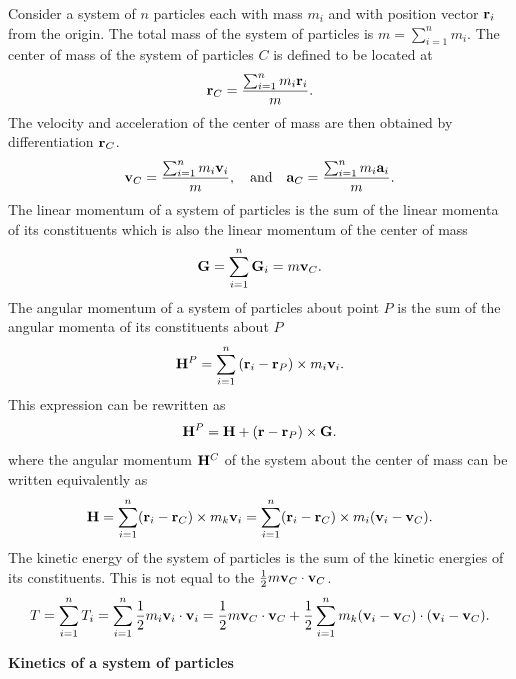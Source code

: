 \documentclass[
  letterpaper,
  DIV=11,
  numbers=noendperiod]{scrreprt}
\newcommand{\lp}{\left(}
\newcommand{\rp}{\right)}
\begin{document}
Consider a system of \(n\) particles each with mass \(m_i\) and with
position vector \({\bf r}_i\) from the origin. The total mass of the
system of particles is \(m = \sum_{i=1}^n m_i\). The center of mass of
the system of particles \(C\) is defined to be located at \begin{align}
    {\bf r}_C = \frac{\sum_{i=1}^n m_i{\bf r}_i}{m}.
\end{align} The velocity and acceleration of the center of mass are then
obtained by differentiation \({\bf r}_C\). \begin{align}
    {\bf v}_C = \frac{\sum_{i=1}^n m_i{\bf v}_i}{m},\quad\text{and}\quad{\bf a}_C = \frac{\sum_{i=1}^n m_i{\bf a}_i}{m}.
\end{align} The linear momentum of a system of particles is the sum of
the linear momenta of its constituents which is also the linear momentum
of the center of mass \begin{align}
    {\bf G} = \sum_{i=1}^n{\bf G}_i = m{\bf v}_C.
\end{align} The angular momentum of a system of particles about point
\(P\) is the sum of the angular momenta of its constituents about \(P\)
\begin{align}
    {\bf H}^P = \sum_{i=1}^n\lp{\bf r}_i-{\bf r}_P\rp\times m_i{\bf v}_i.
\end{align} This expression can be rewritten as \begin{align}
    {\bf H}^P = {\bf H} + ({\bf r}-{\bf r}_P)\times {\bf G}.
\end{align} where the angular momentum \({\bf H}^C\) of the system about
the center of mass can be written equivalently as \begin{align}
    {\bf H} =  \sum_{i=1}^n({\bf r}_i-{\bf r}_C)\times m_k{\bf v}_i= \sum_{i=1}^n({\bf r}_i-{\bf r}_C)\times m_i({\bf v}_i-{\bf v}_C).
\end{align} The kinetic energy of the system of particles is the sum of
the kinetic energies of its constituents. This is not equal to the
\(\frac{1}{2}m{\bf v}_C\cdot{\bf v}_C\). \begin{align}
    T = \sum_{i=1}^nT_i = \sum_{i=1}^n\frac{1}{2}m_i{\bf v}_i\cdot{\bf v}_i = \frac{1}{2}m{\bf v}_C\cdot{\bf v}_C + \frac{1}{2}\sum_{i=1}^nm_k({\bf v}_i-{\bf v}_C)\cdot({\bf v}_i-{\bf v}_C).
\end{align}

\textbf{Kinetics of a system of particles}
\end{document}
